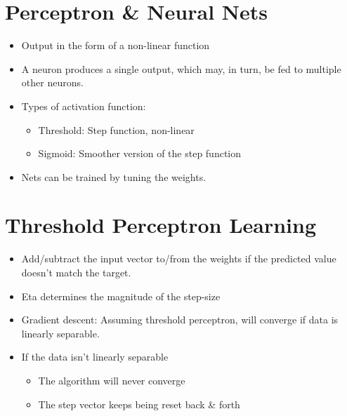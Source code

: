 \documentclass[parskip=half]{scrartcl}
\begin{document}
\newpage


\section{Perceptron \& Neural Nets}\label{perceptron-neural-nets}

    \begin{itemize}
        \item
        Output in the form of a non-linear function
        \item
        A neuron produces a single output, which may, in turn, be fed to
        multiple other neurons.
        \item
        Types of activation function:

        \begin{itemize}
            \item
            Threshold: Step function, non-linear
            \item
            Sigmoid: Smoother version of the step function
        \end{itemize}
        \item
        Nets can be trained by tuning the weights.
    \end{itemize}

    \section{Threshold Perceptron Learning}\label{threshold-perceptron-learning}

    \begin{itemize}
        \item
        Add/subtract the input vector to/from the weights if the predicted
        value doesn't match the target.
        \item
        Eta determines the magnitude of the step-size
        \item
        Gradient descent: Assuming threshold perceptron, will converge if data
        is linearly separable.
        \item
        If the data isn't linearly separable

        \begin{itemize}
            \item
            The algorithm will never converge
            \item
            The step vector keeps being reset back \& forth
        \end{itemize}
    \end{itemize}
\end{document}
